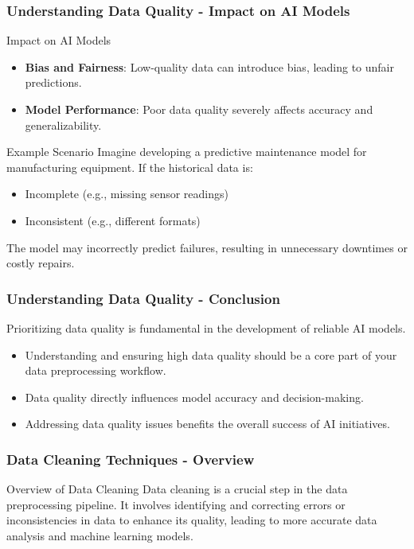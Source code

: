 \documentclass{beamer}
\begin{document}
\begin{frame}[fragile]
    \frametitle{Understanding Data Quality - Impact on AI Models}
    \begin{block}{Impact on AI Models}
        \begin{itemize}
            \item \textbf{Bias and Fairness}: Low-quality data can introduce bias, leading to unfair predictions.
            \item \textbf{Model Performance}: Poor data quality severely affects accuracy and generalizability.
        \end{itemize}
    \end{block}
    
    \begin{block}{Example Scenario}
        Imagine developing a predictive maintenance model for manufacturing equipment. 
        If the historical data is:
        \begin{itemize}
            \item Incomplete (e.g., missing sensor readings)
            \item Inconsistent (e.g., different formats)
        \end{itemize}
        The model may incorrectly predict failures, resulting in unnecessary downtimes or costly repairs.
    \end{block} 
\end{frame}

\begin{frame}[fragile]
    \frametitle{Understanding Data Quality - Conclusion}
    Prioritizing data quality is fundamental in the development of reliable AI models. 
    \begin{itemize}
        \item Understanding and ensuring high data quality should be a core part of your data preprocessing workflow.
        \item Data quality directly influences model accuracy and decision-making.
        \item Addressing data quality issues benefits the overall success of AI initiatives.
    \end{itemize}
\end{frame}

\begin{frame}[fragile]
    \frametitle{Data Cleaning Techniques - Overview}
    \begin{block}{Overview of Data Cleaning}
        Data cleaning is a crucial step in the data preprocessing pipeline. It involves identifying and correcting errors or inconsistencies in data to enhance its quality, leading to more accurate data analysis and machine learning models.
    \end{block}
\end{frame}
\end{document}
